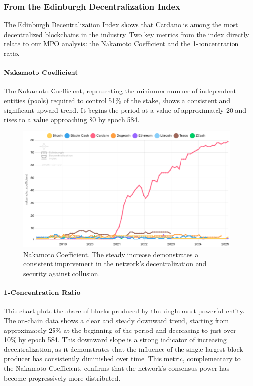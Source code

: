 \documentclass[11pt, letterpaper]{article}
\begin{document}
\subsubsection{From the Edinburgh Decentralization Index}

The \href{https://blockchainlab.inf.ed.ac.uk/edi-dashboard/}{Edinburgh Decentralization Index} shows
that Cardano is among the most decentralized blockchains in the industry. Two key metrics
from the index directly relate to our MPO analysis: the Nakamoto Coefficient and the 1-concentration ratio.

\paragraph{Nakamoto Coefficient} The Nakamoto Coefficient, representing the minimum number of
independent entities (pools) required to control 51\% of the stake, shows a consistent and significant
upward trend. It begins the period at a value of approximately 20 and rises to a value
approaching 80 by epoch 584.

\begin{figure}[H]
	\centering
	\includegraphics[width=\textwidth]{img/consensus-nakamoto_coefficient-chart.png}
	\caption{Nakamoto Coefficient. The steady increase demonstrates a consistent
		improvement in the network's decentralization and security against collusion.}
	\label{fig:nakamoto}
\end{figure}

\paragraph{1-Concentration Ratio} This chart plots the share of blocks produced by the single
most powerful entity. The on-chain data shows a clear and steady downward trend, starting from
approximately 25\% at the beginning of the period and decreasing to just over 10\% by epoch 584.
This downward slope is a strong indicator of increasing decentralization, as it demonstrates that
the influence of the single largest block producer has consistently diminished over time. This metric,
complementary to the Nakamoto Coefficient, confirms that the network's consensus power
has become progressively more distributed.
\end{document}
